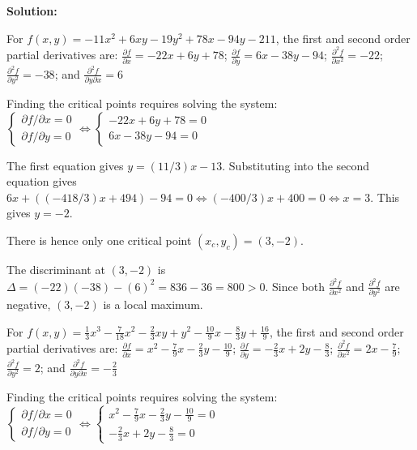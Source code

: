 \documentclass{article}
\newcommand{\partdiff}[2]{\frac{\partial #1}{\partial #2}}
\newcommand{\dr}[1]{\textcolor{dark_red}{#1}}
\begin{document}
\vspace{0.5cm}

\dr{\bf Solution:}

\vspace{0.5cm}

\dr{For \(f(x,y) = -11x^2 + 6xy - 19y^2 + 78x - 94y - 211\), the first and second order partial derivatives are: 
\(\partdiff{f}{x} = -22x + 6y + 78\); \(\partdiff{f}{y} = 6x - 38y - 94\); \(\frac{\partial^2 f}{\partial x^2} = -22\); \(\frac{\partial^2 f}{\partial y^2} = -38\); and \(\frac{\partial^2 f}{\partial y \partial x} = 6\)}

\dr{Finding the critical points requires solving the system: \(\left\{\begin{array}{c} \partial f/\partial x = 0 \\ \partial f/\partial y = 0 \end{array}\right. \iff \left\{\begin{array}{c} -22x + 6y + 78 = 0 \\ 6x - 38y - 94 = 0 \end{array}\right.\)}

\dr{The first equation gives \(y = (11/3)x - 13\). Substituting into the second equation gives \\ \(6x + ((-418/3)x + 494) - 94 = 0 \iff (-400/3)x + 400 = 0 \iff x = 3\). This gives \(y = -2\).}

\dr{There is hence only one critical point \((x_c, y_c) = (3, -2)\).}

\dr{The discriminant at \((3, -2)\) is \(\Delta = (-22)(-38) - (6)^2 = 836 - 36 = 800 > 0\). Since both \(\frac{\partial^2 f}{\partial x^2}\) and \(\frac{\partial^2 f}{\partial y^2}\) are negative, \((3, -2)\) is a local maximum.}

\vspace{1cm}

\dr{For \(f(x,y) = \frac{1}{3}x^3 - \frac{7}{18}x^2 - \frac{2}{3}xy + y^2 - \frac{10}{9}x - \frac{8}{3}y + \frac{16}{9}\), the first and second order partial derivatives are: 
\(\partdiff{f}{x} = x^2 - \frac{7}{9}x - \frac{2}{3}y - \frac{10}{9}\); \(\partdiff{f}{y} = -\frac{2}{3}x + 2y - \frac{8}{3}\); \(\frac{\partial^2 f}{\partial x^2} = 2x - \frac{7}{9}\); \(\frac{\partial^2 f}{\partial y^2} = 2\); and \(\frac{\partial^2 f}{\partial y \partial x} = -\frac{2}{3}\)}

\dr{Finding the critical points requires solving the system: \(\left\{\begin{array}{c} \partial f/\partial x = 0 \\ \partial f/\partial y = 0 \end{array}\right. \iff \left\{\begin{array}{c} x^2 - \frac{7}{9}x - \frac{2}{3}y - \frac{10}{9} = 0 \\ -\frac{2}{3}x + 2y - \frac{8}{3} = 0 \end{array}\right.\)}
\end{document}
